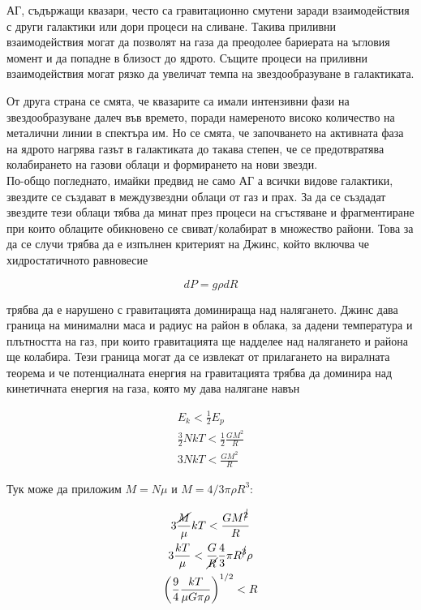 \documentclass[a4paper,12pt]{article}
\begin{document}
АГ, съдържащи квазари, често са гравитационно смутени заради взаимодействия с други галактики или дори процеси на сливане. Такива приливни взаимодействия могат да позволят на газа да преодолее бариерата на ъгловия момент и да попадне в близост до ядрото. Същите процеси на приливни взаимодействия могат рязко да увеличат темпа на звездообразуване в галактиката.

От друга страна се смята, че квазарите са имали интензивни фази на звездообразуване далеч във времето, поради намереното високо количество на металични линии в спектъра им. Но се смята, че започването на активната фаза на ядрото нагрява газът в галактиката до такава степен, че се предотвратява колабирането на газови облаци и формирането на нови звезди.\\

По-общо погледнато, имайки предвид не само АГ а всички видове галактики, звездите се създават в междузвездни облаци от газ и прах. За да се създадат звездите тези облаци тябва да минат през процеси на сгъстяване и фрагментиране при които облаците обикновено се свиват/колабират в множество райони. Това за да се случи трябва да е изпълнен критерият на Джинс, който включва че хидростатичното равновесие

\begin{equation}
    dP = g\rho dR
\end{equation}

трябва да е нарушено с гравитацията доминираща над налягането. Джинс дава граница на минимални маса и радиус на район в облака, за дадени температура и плътността на газ, при които гравитацията ще надделее над налягането и района ще колабира. Тези граница могат да се извлекат от прилагането на виралната теорема и че потенциалната енергия на гравитацията трябва да доминира над кинетичната енергия на газа, която му дава налягане навън

\begin{gather}
    E_k < \frac{1}{2}E_p\\
    \frac{3}{2}NkT < \frac{1}{2}\frac{GM^2}{R}\\
    3NkT < \frac{GM^2}{R}
\end{gather}

Тук може да приложим $M=N\mu$ и $M=4/3 \pi \rho R^3$:

\begin{gather}
    \label{eq:jeans_derivation}
    3\frac{\cancel{M}}{\mu}kT < \frac{GM^{\cancel{2}}}{R}\\
    3\frac{kT}{\mu} < \frac{G}{\cancel{R}} \frac{4}{3}\pi R^{\cancel{3}} \rho\\
    \left( \frac{9}{4} \frac{kT}{\mu G\pi \rho} \right)^{1/2} < R
    \label{eq:R_jeans}
\end{gather}
\end{document}
